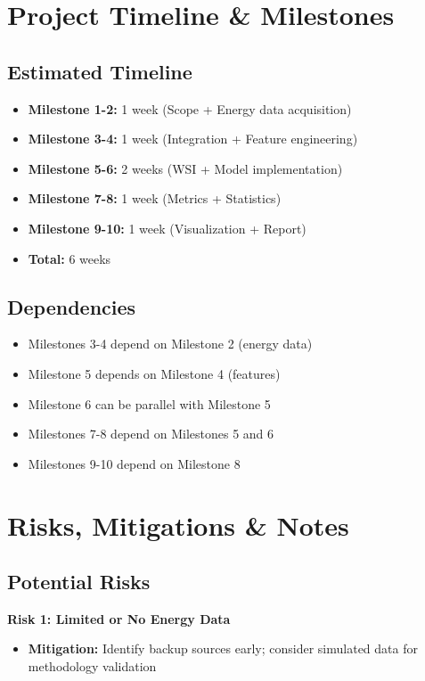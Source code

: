 \documentclass[11pt,a4paper]{article}
\begin{document}
\section{Project Timeline \& Milestones}

\subsection{Estimated Timeline}

\begin{itemize}
    \item \textbf{Milestone 1-2:} 1 week (Scope + Energy data acquisition)
    \item \textbf{Milestone 3-4:} 1 week (Integration + Feature engineering)
    \item \textbf{Milestone 5-6:} 2 weeks (WSI + Model implementation)
    \item \textbf{Milestone 7-8:} 1 week (Metrics + Statistics)
    \item \textbf{Milestone 9-10:} 1 week (Visualization + Report)
    \item \textbf{Total:} 6 weeks
\end{itemize}

\subsection{Dependencies}

\begin{itemize}
    \item Milestones 3-4 depend on Milestone 2 (energy data)
    \item Milestone 5 depends on Milestone 4 (features)
    \item Milestone 6 can be parallel with Milestone 5
    \item Milestones 7-8 depend on Milestones 5 and 6
    \item Milestones 9-10 depend on Milestone 8
\end{itemize}

\section{Risks, Mitigations \& Notes}

\subsection{Potential Risks}

\textbf{Risk 1: Limited or No Energy Data}
\begin{itemize}
    \item \textbf{Mitigation:} Identify backup sources early; consider simulated data for methodology validation
\end{itemize}
\end{document}
